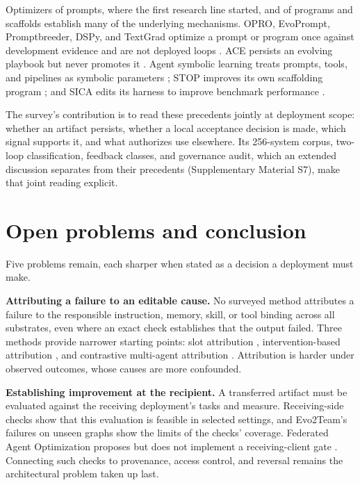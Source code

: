 Optimizers of prompts, where the first research line started, and of programs and scaffolds establish many of the underlying mechanisms. OPRO, EvoPrompt, Promptbreeder, DSPy, and TextGrad optimize a prompt or program once against development evidence and are not deployed loops \cite{yang2023opro, guo2023evoprompt, fernando2023promptbreeder, khattab2023dspy, yuksekgonul2024textgrad}. ACE persists an evolving playbook but never promotes it \cite{ace2025agentic}. Agent symbolic learning treats prompts, tools, and pipelines as symbolic parameters \cite{zhou2024symbolic}; STOP improves its own scaffolding program \cite{zelikman2023stop}; and SICA edits its harness to improve benchmark performance \cite{robeyns2025sica}.

The survey's contribution is to read these precedents jointly at deployment scope: whether an artifact persists, whether a local acceptance decision is made, which signal supports it, and what authorizes use elsewhere. Its 256-system corpus, two-loop classification, feedback classes, and governance audit, which an extended discussion separates from their precedents (Supplementary Material S7), make that joint reading explicit.

\section{Open problems and conclusion}\label{sec:open}

Five problems remain, each sharper when stated as a decision a deployment must make.

\textbf{Attributing a failure to an editable cause.} No surveyed method attributes a failure to the responsible instruction, memory, skill, or tool binding across all substrates, even where an exact check establishes that the output failed. Three methods provide narrower starting points: slot attribution \cite{nguyen2026harnessevo}, intervention-based attribution \cite{chu2026agentgrad}, and contrastive multi-agent attribution \cite{zehle2026cantante}. Attribution is harder under observed outcomes, whose causes are more confounded.

\textbf{Establishing improvement at the recipient.} A transferred artifact must be evaluated against the receiving deployment's tasks and measure. Receiving-side checks show that this evaluation is feasible in selected settings, and Evo2Team's failures on unseen graphs show the limits of the checks' coverage. Federated Agent Optimization proposes but does not implement a receiving-client gate \cite{yang2026fao}. Connecting such checks to provenance, access control, and reversal remains the architectural problem taken up last.

